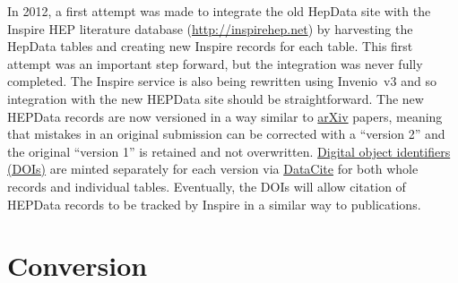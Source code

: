\documentclass[a4paper]{jpconf}
\begin{document}
In 2012, a first attempt was made to integrate the old HepData site with the Inspire HEP literature database (\url{http://inspirehep.net}) by harvesting the HepData tables and creating new Inspire records for each table.  This first attempt was an important step forward, but the integration was never fully completed.  The Inspire service is also being rewritten using Invenio~v3 and so integration with the new HEPData site should be straightforward.  The new HEPData records are now versioned in a way similar to \href{https://arxiv.org/}{arXiv} papers, meaning that mistakes in an original submission can be corrected with a ``version 2'' and the original ``version 1'' is retained and not overwritten.  \href{https://www.doi.org}{Digital object identifiers (DOIs)} are minted separately for each version via \href{https://www.datacite.org}{DataCite} for both whole records and individual tables.  Eventually, the DOIs will allow citation of HEPData records to be tracked by Inspire in a similar way to publications.

\section{Conversion} \label{sec:conversion}
\end{document}
